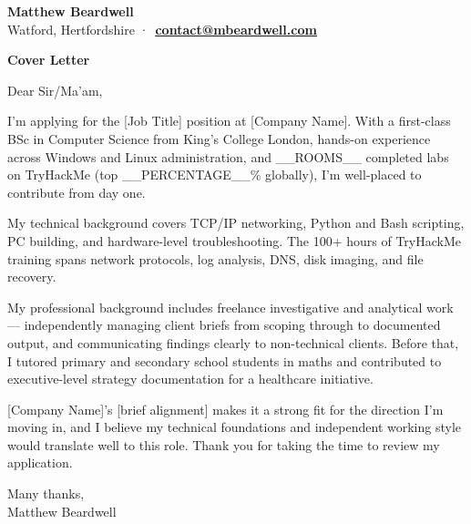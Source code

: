 \documentclass[10pt,a4paper]{article}
\newcommand{\paragap}{0.20em}
\newcommand{\headermargin}{0.00em}
\newcommand{\setfontsize}[2]{\fontsize{#1}{#1}\selectfont{}#2}
\newcommand{\textcolorbf}[1]{\textbf{\textcolor{surface}{#1}}}
\newcommand{\cvlink}[2]{\uline{\href{#1}{\textcolor{surface}{\textbf{#2}}}}}
\newenvironment{cvsection}[1]{
  \begin{tcolorbox}[
    colback=accent!25,
    boxrule=0pt,
    colframe=white,
    left=4pt,
    right=4pt,
    top=2pt,
    bottom=2pt,
    sharp corners=all,
    coltext=surface
  ]
    \textcolorbf{#1}
  \end{tcolorbox}
  \vspace{\headermargin}
}
{\vspace{\headermargin}}
\begin{document}
\begin{flushleft}
  {{\setfontsize{26pt}{\textcolorbf{Matthew Beardwell}}}} \\[1.1em]
  Watford, Hertfordshire ·\
  \cvlink{mailto:contact@mbeardwell.com}{contact@mbeardwell.com} \\
\end{flushleft}

\begin{cvsection}{Cover Letter}
{\renewcommand{\paragap}{0.50em}\setlength{\parskip}{\paragap}
Dear Sir/Ma'am,

I'm applying for the [Job Title] position at [Company Name]. With a first-class BSc in Computer 
Science from King's College London, hands-on experience across Windows and Linux administration, 
and __ROOMS__ completed labs on TryHackMe (top __PERCENTAGE__\% globally), I'm well-placed to 
contribute from day one.

My technical background covers TCP/IP networking, Python and Bash scripting, PC building, and 
hardware-level troubleshooting. The 100+ hours of TryHackMe training spans network 
protocols, log analysis, DNS, disk imaging, and file recovery.

My professional background includes freelance investigative and analytical work --- independently 
managing client briefs from scoping through to documented output, and communicating findings clearly 
to non-technical clients. Before that, I tutored primary and secondary school students in maths and 
contributed to executive-level strategy documentation for a healthcare initiative.

[Company Name]'s [brief alignment] makes it a strong fit for the direction I'm moving in, and I 
believe my technical foundations and independent working style would translate well to this role. 
Thank you for taking the time to review my application.

Many thanks,\\
Matthew Beardwell
}
\end{cvsection}
\end{document}
